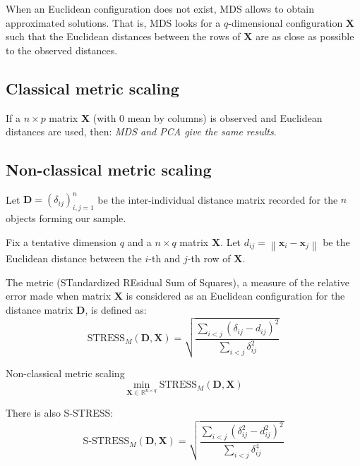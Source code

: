 When an Euclidean configuration does not exist, MDS allows to
obtain approximated solutions. That is, MDS looks for a $q$-dimensional
configuration $\boldsymbol{X}$ such that the Euclidean distances between
the rows of $\boldsymbol{X}$ are as close as possible to the observed
distances.

\subsection{Classical metric scaling}

If a $n \times p$ matrix $\boldsymbol{X}$ (with 0 mean by columns) is observed
and Euclidean distances are used, then: \emph{MDS and PCA give the same results}.

\subsection{Non-classical metric scaling}%
\label{sec:non-classical-metric-scaling}

Let $\boldsymbol{D} = (\delta_{ij})^n_{i,j=1}$ be the inter-individual distance
matrix recorded for the $n$ objects forming our sample.

Fix a tentative dimension $q$ and a $n \times q$ matrix $\boldsymbol{X}$.
Let $d_{ij} = \left\lVert \boldsymbol{x}_i - \boldsymbol{x}_j \right\rVert$ be the
Euclidean distance between the $i$-th and $j$-th row of $\boldsymbol{X}$.

The metric  (STandardized REsidual Sum of Squares), a measure
of the relative error made when matrix $\boldsymbol{X}$ is considered as
an Euclidean configuration for the distance matrix $\boldsymbol{D}$, is defined as:
\begin{equation*}
	\text{STRESS}_M(\boldsymbol{D}, \boldsymbol{X}) = \sqrt{\frac
		{\sum_{i<j}(\delta_{ij} - d_{ij})^2}
		{\sum_{i<j}\delta_{ij}^2}
	}
\end{equation*}

\begin{problem}{Non-classical metric scaling}{}
\begin{equation*}
	\min_{\boldsymbol{X} \in \mathds{R}^{n\times q}} \text{STRESS}_M(\boldsymbol{D}, \boldsymbol{X})
\end{equation*}
\end{problem}

There is also S-STRESS:
\begin{equation*}
	\text{S-STRESS}_M(\boldsymbol{D}, \boldsymbol{X}) = \sqrt{\frac
		{\sum_{i<j}(\delta_{ij}^2 - d_{ij}^2)^2}
		{\sum_{i<j}\delta_{ij}^4}
	}
\end{equation*}

